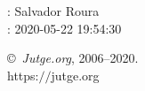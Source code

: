 \documentclass[11pt]{article}
\begin{document}
    \newcommand{\SampleTwoCol}{\SampleTwoColInputOutput{sample-1}{1}\SampleTwoColInputOutput{sample-2}{2}}
    \newcommand{\SampleOneCol}{\SampleOneColInputOutput{sample-1}{1}\SampleOneColInputOutput{sample-2}{2}}

    \ProblemInformation
    \Author: Salvador Roura\\    
    \Generation: 2020-05-22 19:54:30

    \bigskip

    \copyright\ \emph{Jutge.org}, 2006--2020. \\
    https:$/\!\!/$jutge.org
\end{document}
